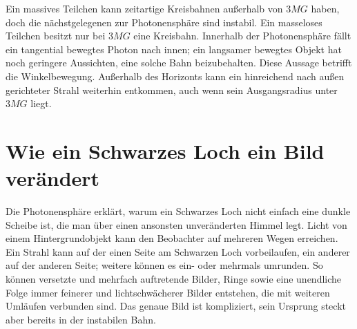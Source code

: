 \begin{classroomqa}
\end{classroomqa}

\begin{classroomqa}
\end{classroomqa}

Ein massives Teilchen kann zeitartige Kreisbahnen außerhalb von \(3MG\) haben, doch die nächstgelegenen zur Photonensphäre sind instabil. Ein masseloses Teilchen besitzt nur bei \(3MG\) eine Kreisbahn. Innerhalb der Photonensphäre fällt ein tangential bewegtes Photon nach innen; ein langsamer bewegtes Objekt hat noch geringere Aussichten, eine solche Bahn beizubehalten. Diese Aussage betrifft die Winkelbewegung. Außerhalb des Horizonts kann ein hinreichend nach außen gerichteter Strahl weiterhin entkommen, auch wenn sein Ausgangsradius unter \(3MG\) liegt.

\section{Wie ein Schwarzes Loch ein Bild verändert}

Die Photonensphäre erklärt, warum ein Schwarzes Loch nicht einfach eine dunkle Scheibe ist, die man über einen ansonsten unveränderten Himmel legt. Licht von einem Hintergrundobjekt kann den Beobachter auf mehreren Wegen erreichen. Ein Strahl kann auf der einen Seite am Schwarzen Loch vorbeilaufen, ein anderer auf der anderen Seite; weitere können es ein- oder mehrmals umrunden. So können versetzte und mehrfach auftretende Bilder, Ringe sowie eine unendliche Folge immer feinerer und lichtschwächerer Bilder entstehen, die mit weiteren Umläufen verbunden sind. Das genaue Bild ist kompliziert, sein Ursprung steckt aber bereits in der instabilen Bahn.

